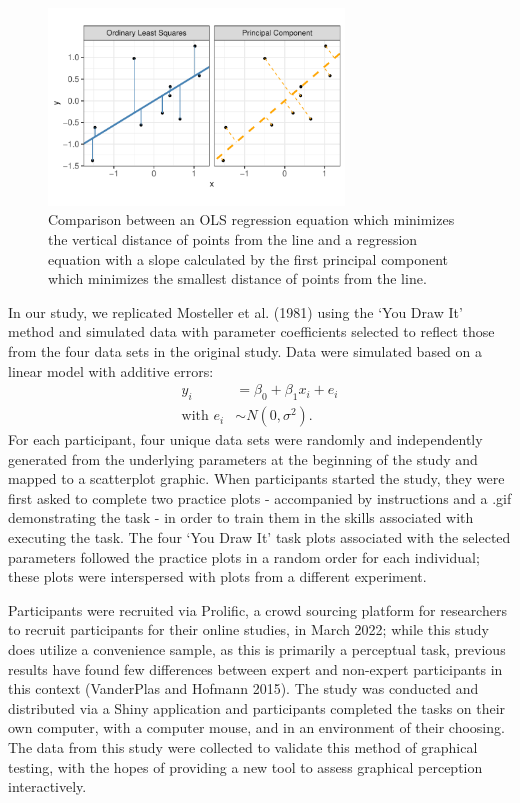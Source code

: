 \documentclass[
]{jds}
\begin{document}
\begin{figure}

{\centering \includegraphics[width=0.7\textwidth,height=\textheight]{./images/fig-pca-plot-1.pdf}

}

\caption{\label{fig-pca-plot}Comparison between an OLS regression
equation which minimizes the vertical distance of points from the line
and a regression equation with a slope calculated by the first principal
component which minimizes the smallest distance of points from the
line.}

\end{figure}

In our study, we replicated Mosteller et al. (1981) using the `You Draw
It' method and simulated data with parameter coefficients selected to
reflect those from the four data sets in the original study. Data were
simulated based on a linear model with additive errors: \begin{align}
y_i & = \beta_0 + \beta_1 x_i + e_i \\
\text{with } e_i & \sim N(0, \sigma^2). \nonumber
\end{align} For each participant, four unique data sets were randomly
and independently generated from the underlying parameters at the
beginning of the study and mapped to a scatterplot graphic. When
participants started the study, they were first asked to complete two
practice plots - accompanied by instructions and a .gif demonstrating
the task - in order to train them in the skills associated with
executing the task. The four `You Draw It' task plots associated with
the selected parameters followed the practice plots in a random order
for each individual; these plots were interspersed with plots from a
different experiment.

Participants were recruited via Prolific, a crowd sourcing platform for
researchers to recruit participants for their online studies, in March
2022; while this study does utilize a convenience sample, as this is
primarily a perceptual task, previous results have found few differences
between expert and non-expert participants in this context (VanderPlas
and Hofmann 2015). The study was conducted and distributed via a Shiny
application and participants completed the tasks on their own computer,
with a computer mouse, and in an environment of their choosing. The data
from this study were collected to validate this method of graphical
testing, with the hopes of providing a new tool to assess graphical
perception interactively.
\end{document}
